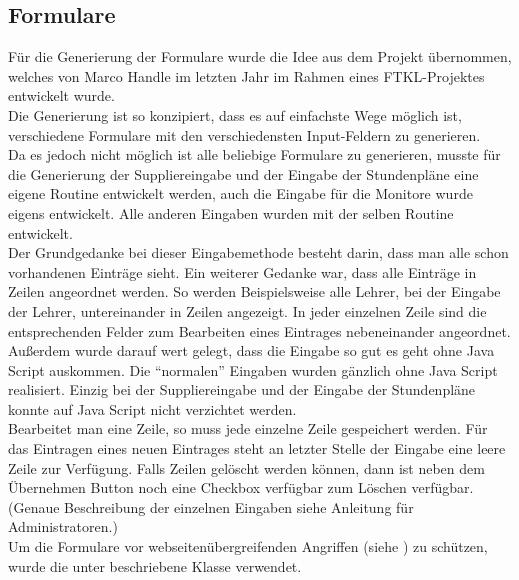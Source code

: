 \subsection{Formulare} \label{sec:content_draft_form}
Für die Generierung der Formulare wurde die Idee aus dem Projekt übernommen, welches von Marco Handle im letzten Jahr im Rahmen eines FTKL-Projektes entwickelt wurde.\\
Die Generierung ist so konzipiert, dass es auf einfachste Wege möglich ist, verschiedene Formulare mit den verschiedensten Input-Feldern zu generieren.\\
Da es jedoch nicht möglich ist alle beliebige Formulare zu generieren, musste für die Generierung der Suppliereingabe und der Eingabe der Stundenpläne eine eigene Routine entwickelt werden, auch die Eingabe für die Monitore wurde eigens entwickelt. Alle anderen Eingaben wurden mit der selben Routine entwickelt.\\
Der Grundgedanke bei dieser Eingabemethode besteht darin, dass man alle schon vorhandenen Einträge sieht. Ein weiterer Gedanke war, dass alle Einträge in Zeilen angeordnet werden. So werden Beispielsweise alle Lehrer, bei der Eingabe der Lehrer, untereinander in Zeilen angezeigt. In jeder einzelnen Zeile sind die entsprechenden Felder zum Bearbeiten eines Eintrages nebeneinander angeordnet. Außerdem wurde darauf wert gelegt, dass die Eingabe so gut es geht ohne Java Script auskommen. Die \enquote{normalen} Eingaben wurden gänzlich ohne Java Script realisiert. Einzig bei der Suppliereingabe und der Eingabe der Stundenpläne konnte auf Java Script nicht verzichtet werden.\\
Bearbeitet man eine Zeile, so muss jede einzelne Zeile gespeichert werden. Für das Eintragen eines neuen Eintrages steht an letzter Stelle der Eingabe eine leere Zeile zur Verfügung. Falls Zeilen gelöscht werden können, dann ist neben dem Übernehmen Button noch eine Checkbox verfügbar zum Löschen verfügbar. (Genaue Beschreibung der einzelnen Eingaben siehe Anleitung für Administratoren.)\\
Um die Formulare vor webseitenübergreifenden Angriffen (siehe ) zu schützen, wurde die unter  beschriebene Klasse verwendet.
